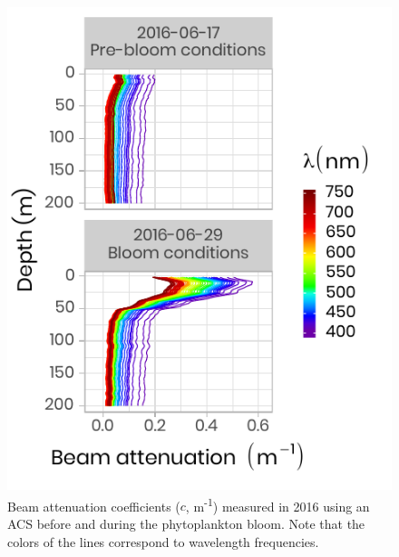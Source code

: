 \documentclass[12pt,a4paper]{scrartcl}
\begin{document}
\begin{figure}[h]
	\centering
	\includegraphics[scale = 2]{../../../graphs/fig07.pdf}
	\caption{Beam attenuation coefficients ($c$, m\textsuperscript{-1}) measured in 2016 using an ACS before and during the phytoplankton bloom. Note that the colors of the lines correspond to wavelength frequencies.}
\end{figure}

\clearpage
\newpage
\end{document}
